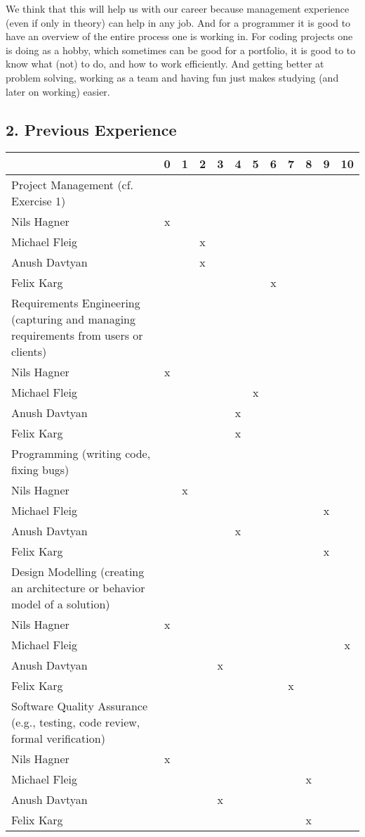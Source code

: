 \documentclass{scrartcl}
\begin{document}
We think that this will help us with our career because management experience (even if only in theory) can help in any job. And for a programmer it is good to have an overview of the entire process one is working in. For coding projects one is doing as a hobby, which sometimes can be good for a portfolio, it is good to to know what (not) to do, and how to work efficiently. And getting better at problem solving, working as a team and having fun just makes studying (and later on working) easier.

\subsection*{2. Previous Experience}


\begin{tabular}{| p{10cm} | c | c | c | c | c | c | c | c | c | c | c |}
	\hline
	& 0& 1& 2& 3& 4& 5& 6& 7& 8& 9& 10\\
	\hline
	Project Management (cf. Exercise 1) \\
	\hline
	Nils Hagner &x&&&&&&&&&&\\ \hline
	Michael Fleig &&&x&&&&&&&&\\ \hline
	Anush Davtyan &&&x&&&&&&&&\\ \hline
	Felix Karg &&&&&&&x&&&&\\ \hline
	Requirements Engineering (capturing and managing requirements from users or clients)\\
	\hline
	Nils Hagner &x&&&&&&&&&&\\ \hline
	Michael Fleig &&&&&&x&&&&&\\ \hline
	Anush Davtyan &&&&&x&&&&&&\\ \hline
	Felix Karg &&&&&x&&&&&&\\ \hline
	Programming (writing code, fixing bugs)\\
	\hline
	Nils Hagner &&x&&&&&&&&&\\ \hline
	Michael Fleig &&&&&&&&&&x&\\ \hline
	Anush Davtyan &&&&&x&&&&&&\\ \hline
	Felix Karg &&&&&&&&&&x&\\ \hline
	Design Modelling (creating an architecture or behavior model of a solution)\\
	\hline
	Nils Hagner &x&&&&&&&&&&\\ \hline
	Michael Fleig &&&&&&&&&&&x\\ \hline
	Anush Davtyan &&&&x&&&&&&&\\ \hline
	Felix Karg &&&&&&&&x&&&\\ \hline
	Software Quality Assurance (e.g., testing, code review, formal verification)\\
	\hline
	Nils Hagner &x&&&&&&&&&&\\ \hline
	Michael Fleig &&&&&&&&&x&&\\ \hline
	Anush Davtyan &&&&x&&&&&&&\\ \hline
	Felix Karg &&&&&&&&&x&&\\ \hline
\end{tabular}
\end{document}
